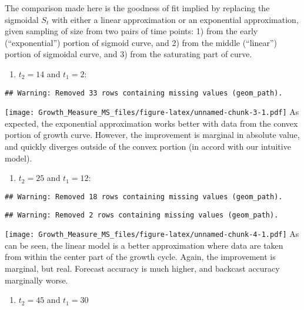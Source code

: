 \documentclass[]{article}
\providecommand{\tightlist}{%
  \setlength{\itemsep}{0pt}\setlength{\parskip}{0pt}}
\begin{document}
The comparison made here is the goodness of fit implied by replacing the
sigmoidal \(S_t\) with either a linear approximation or an exponential
approximation, given sampling of size from two pairs of time points: 1)
from the early (``exponential'') portion of sigmoid curve, and 2) from
the middle (``linear'') portion of sigmoidal curve, and 3) from the
saturating part of curve.

\begin{enumerate}
\def\labelenumi{\arabic{enumi})}
\tightlist
\item
  \(t_2 = 14\) and \(t_1=2\):
\end{enumerate}

\begin{verbatim}
## Warning: Removed 33 rows containing missing values (geom_path).
\end{verbatim}

\texttt{[image: Growth\_Measure\_MS\_files/figure-latex/unnamed-chunk-3-1.pdf]}
As expected, the exponential approximation works better with data from
the convex portion of growth curve. However, the improvement is marginal
in absolute value, and quickly diverges outside of the convex portion
(in accord with our intuitive model).

\begin{enumerate}
\def\labelenumi{\arabic{enumi})}
\setcounter{enumi}{1}
\tightlist
\item
  \(t_2 = 25\) and \(t_1 = 12\):
\end{enumerate}

\begin{verbatim}
## Warning: Removed 18 rows containing missing values (geom_path).
\end{verbatim}

\begin{verbatim}
## Warning: Removed 2 rows containing missing values (geom_path).
\end{verbatim}

\texttt{[image: Growth\_Measure\_MS\_files/figure-latex/unnamed-chunk-4-1.pdf]}
As can be seen, the linear model is a better approximation where data
are taken from within the center part of the growth cycle. Again, the
improvement is marginal, but real. Forecast accuracy is much higher, and
backcast accuracy marginally worse.

\begin{enumerate}
\def\labelenumi{\arabic{enumi})}
\setcounter{enumi}{2}
\tightlist
\item
  \(t_2=45\) and \(t_1=30\)
\end{enumerate}
\end{document}
